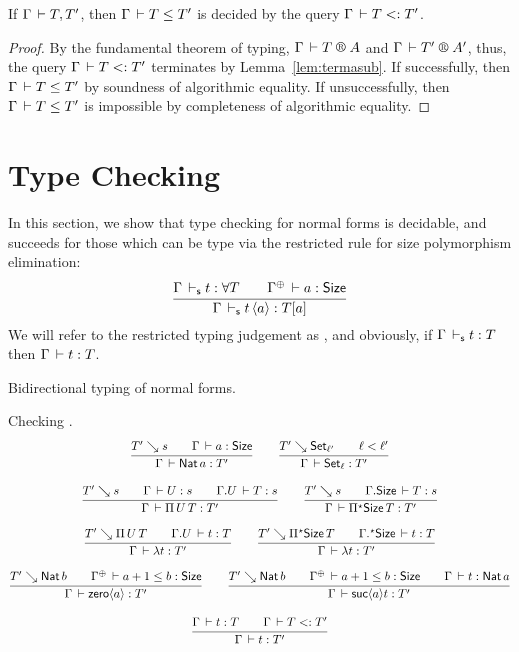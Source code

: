 \documentclass[acmlarge,review,anonymous]{acmart}\settopmatter{printfolios=true}
\begin{document}
\begin{theorem}
  If\/ $\Gamma \,\vdash T,T'$, then $\Gamma \,\vdash T \leq T'$ is decided by the query $\Gamma \,\vdash T \mathrel{{<}{:}} T'$.
\end{theorem}
\begin{proof}
  By the fundamental theorem of typing, $\RG \Gamma T A$ and $\RG \Gamma {T'} {A'}$,
  thus, the query  $\Gamma \,\vdash T \mathrel{{<}{:}} T'$ terminates by Lemma~\ref{lem:termasub}.
  If successfully, then $\Gamma \,\vdash T \leq T'$ by soundness of algorithmic equality.
  If unsuccessfully, then $\Gamma \,\vdash T \leq T'$ is impossible by completeness of algorithmic equality.
\end{proof}


\section{Type Checking}
\label{sec:tycheck}

In this section, we show that type checking for normal forms is decidable, and succeeds for those which can be type via the restricted rule for size polymorphism elimination:
\[
  \ru{\Gamma \ders t : \forall T \qquad
      \resurrect\Gamma \der a : \Size
    }{\Gamma \ders t\, \ann a : T[a]}
\]
We will refer to the restricted typing judgement as , and obviously,
if\/ $\Gamma \,\vdash_\mathsf{s} t : T$ then $\Gamma \,\vdash t : T$.

Bidirectional typing of normal forms.

Checking .
\begin{gather*}
  \ru{T' \evalsto s \qquad
      \Gamma \der a : \Size
    }{\Gamma \der \Nat a \jchk T'}
\qquad
  \ru{T' \evalsto \Set[\ell'] \qquad \ell < \ell'
    }{\Gamma \der \Set[\ell] \jchk T'}
\\[2ex]
  \ru{T' \evalsto s \qquad
      \Gamma \der U \jchk s \qquad
      \cext \Gamma U \der T \jchk s
    }{\Gamma \der \piT U T \jchk T'}
\qquad
  \ru{T' \evalsto s \qquad
      \cext \Gamma \Size \der T \jchk s
    }{\Gamma \der \epiT \Size T \jchk T'}
\\[2ex]
  \ru{T' \evalsto \piT U T \qquad
      \cext \Gamma U \der t \jchk T
    }{\Gamma \der \lambda t \jchk T'}
\qquad
  \ru{T' \evalsto \epiT \Size T \qquad
      \eext \Gamma \Size \der t \jchk T
    }{\Gamma \der \lambda t \jchk T'}
\\[2ex]
  \ru{T' \evalsto \Nat b \qquad
      \resurrect \Gamma \der a+1 \leq b : \Size
    }{\Gamma \der \zero a \jchk T'}
\qquad
  \ru{T' \evalsto \Nat b \qquad
      \resurrect \Gamma \der a+1 \leq b : \Size \qquad
      \Gamma \der t \jchk \Nat a
    }{\Gamma \der \suc a t \jchk T'}
\\[2ex]
  \ru{\Gamma \der t \jinf T \qquad \Gamma \der T \asub T'
    }{\Gamma \der t \jchk T'}
\end{gather*}
\end{document}
